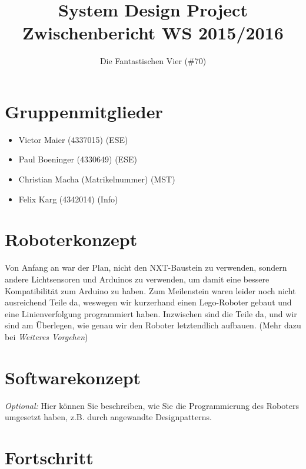 \documentclass[11pt,a4paper]{article}
\title{
  \Huge System Design Project \\
  \LARGE Zwischenbericht WS 2015/2016
}
\author{
  \Large Die Fantastischen Vier (\#70) \\
}
\begin{document}
\maketitle

\section{Gruppenmitglieder}
\begin{itemize}
  \item Victor Maier (4337015) (ESE)
  \item Paul Boeninger (4330649) (ESE)
  \item Christian Macha (Matrikelnummer) (MST)
  \item Felix Karg (4342014) (Info)
\end{itemize}

\section{Roboterkonzept}

Von Anfang an war der Plan, nicht den NXT-Baustein zu verwenden, sondern andere Lichtsensoren
und Arduinos zu verwenden, um damit eine bessere Kompatibilität zum Arduino zu haben. 
Zum Meilenstein waren leider noch nicht ausreichend Teile da, weswegen wir kurzerhand
einen Lego-Roboter gebaut und eine Linienverfolgung programmiert haben. Inzwischen sind die Teile
da, und wir sind am Überlegen, wie genau wir den Roboter letztendlich aufbauen. 
(Mehr dazu bei \emph{Weiteres Vorgehen})

\section{Softwarekonzept}

\emph{Optional:} Hier können Sie beschreiben, wie Sie die Programmierung des Roboters umgesetzt 
haben, z.B. durch angewandte Designpatterns.

\section{Fortschritt}
\end{document}
